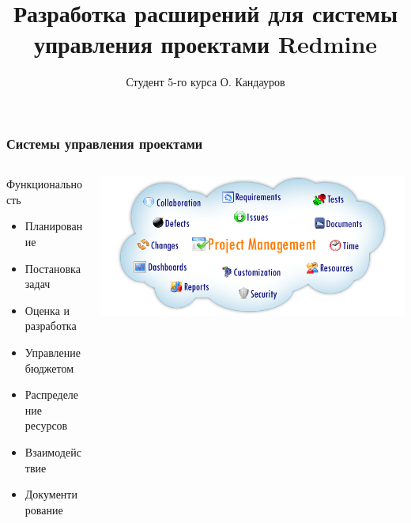 \documentclass[unicode]{beamer}
\title[Разработка расширений для системы управления проектами Redmine]{
Разработка расширений для системы управления проектами Redmine
}
\author[Кандауров О.\,В.]{Студент 5-го курса О. Кандауров}
\institute{
Научный руководитель: ст. преподаватель Парамонов~И.\,В.
}
\date{}
\begin{document}
\maketitle

\begin{frame}
\transwipe[direction=90]
\frametitle{Системы управления проектами}
\begin{columns}
\begin{column}{0.45\textwidth}
\begin{block}{Функциональность}
\begin{itemize}
  \item Планирование
  \item Постановка задач
  \item Оценка и разработка
  \item Управление бюджетом
  \item Распределение ресурсов
  \item Взаимодействие
  \item Документирование
\end{itemize}
\end{block}
\end{column}
\begin{column}{0.55\textwidth}
\centerline{\includegraphics[width=1\textwidth]{project-management-software.png}}
\end{column}
\end{columns}
\end{frame}

\end{document}
